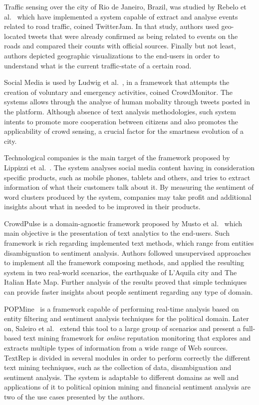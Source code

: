 Traffic sensing over the city of Rio de Janeiro, Brazil, was studied by Rebelo et al.~\cite{rebelo2015twitterjam} which have implemented a system capable of extract and analyse events related to road traffic, coined  TwitterJam. In that study, authors used geo-located tweets that were already confirmed as being related to events on the roads and compared their counts with official sources. Finally but not least, authors depicted geographic visualizations to the end-users in order to understand what is the current traffic-state of a certain road.

Social Media is used by Ludwig et al.~\cite{ludwig2015crowdmonitor}, in a framework that attempts the creation of voluntary and emergency activities, coined CrowdMonitor. The systems allows through the analyse of human mobality through tweets posted in the platform. Although absence of text analysis methodologies, such system intents to promote more cooperation between citizens and also promotes the applicability of crowd sensing, a crucial factor for the smartness evolution of a city.

Technological companies is the main target of the framework proposed by Lippizzi et al.~\cite{lipizzi2015extracting}. The system analyses social media content having in consideration specific products, such as mobile phones, tablets and others, and tries to extract information of what their customers talk about it. By measuring the sentiment of word clusters produced by the system, companies may take profit and additional insights about what in needed to be improved in their products.

CrowdPulse is a domain-agnostic framework proposed by Musto et al.~\cite{musto2015crowdpulse} which main objective is the presentation of text analytics to the end-users. Such framework is rich regarding implemented text methods, which range from entities disambiguation to sentiment analysis. Authors followed unsupervised approaches to implement all the framework composing methods, and applied the resulting system in two real-world scenarios, the earthquake of L'Aquila city and The Italian Hate Map. Further analysis of the results proved that simple techniques can provide faster insights about people sentiment regarding any type of domain.

POPMine~\cite{saleiro2015popmine} is a framework capable of performing real-time analysis based on entity filtering and sentiment analysis techniques for the political domain. Later on, Saleiro et al.~\cite{saleiro2017texrep} extend this tool to a large group of scenarios and present a full-based text mining framework for \textit{online} reputation monitoring that explores and extracts multiple types of information from a wide range of Web sources. TextRep is divided in several modules in order to perform correctly the different text mining techniques, such as the collection of data, disambiguation and sentiment analysis. The system is adaptable to different domains as well and applications of it to political opinion mining and financial sentiment analysis are two of the use cases presented by the authors.

